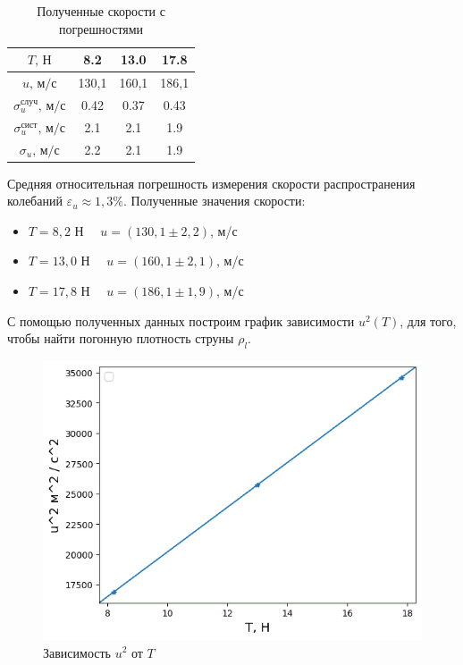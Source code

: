 \documentclass[
a4paper, %
12pt, %
]{article}
\begin{document}
	\begin{table}[h]
		\begin{center}
			\begin{tabular}{|c|c|c|c|}
				\hline
				$T\text{, Н}$ & 8.2 & 13.0 & 17.8\\ \hline
				$u\text{, м/с}$  & 130,1 & 160,1 & 186,1 \\ \hline
				$\sigma_{u}^{\text{случ}} \text{, м/с}$ & 0.42 & 0.37 & 0.43  \\ \hline
				$\sigma_{u}^{\text{сист}} \text{, м/с}$ & 2.1 & 2.1 & 1.9 \\ \hline
				$\sigma_{u} \text{, м/с}$ & 2.2 & 2.1 & 1.9 \\ \hline
			\end{tabular}
			\caption{Полученные скорости с погрешностями}
		\end{center}
	\end{table}
	
	\noindent
	Средняя относительная погрешность измерения скорости распространения колебаний $\varepsilon_u \approx 1,3\% $. Полученные значения скорости:
	
	\begin{itemize}
		\item $T = 8,2$ Н  $\quad u = (130,1 \pm 2,2)$, м/с
		\item  $T = 13,0$ Н  $\quad u = (160,1 \pm 2,1)$, м/с
		\item  $T = 17,8$ Н  $\quad u = (186,1 \pm 1,9)$, м/с
	\end{itemize}
	
	С помощью полученных данных построим график зависимости $u^2(T)$, для того, чтобы найти погонную плотность струны $ \rho_l $.
	
	\begin{figure}[h!]
		\begin{center}
			\includegraphics[scale=0.96]{graph_u_T.png}
			\caption{Зависимость $ u^2 $ от $ T $}
			\label{graph_u_T}
		\end{center}
	\end{figure}
	
\end{document}
